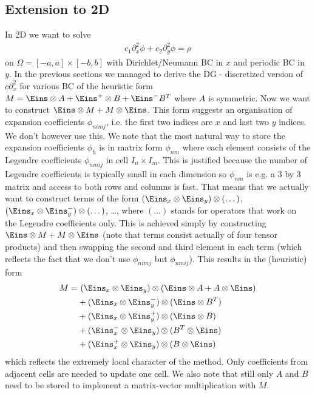 \documentclass[a4paper,12pt]{scrartcl}
\begin{document}
\subsection{Extension to 2D}
In 2D we want to solve
\begin{align}
    c_1\partial_x^2 \phi + c_2 \partial_y^2 \phi = \rho
    \label{}
\end{align}
on $\Omega = [-a,a]\times[-b,b]$ with Dirichlet/Neumann BC in $x$ and periodic BC
in $y$. 
In the previous sections we managed to derive the DG - discretized version of
$c\partial_x^2$ for various BC of the heuristic form
$M = \Eins\otimes A + \Eins^+ \otimes B + \Eins^- B^T$ where $A$ is symmetric.
Now we want to construct $\Eins\otimes M  + M \otimes \Eins$. This form 
suggests an organisation of expansion coefficients $\phi_{nimj}$, i.e. the 
first two indices are $x$ and last two $y$ indices. 
We don't however
use this. 
We note that
the most natural way to store the expansion coefficients $\phi_h$ is in matrix
form $\phi_{nm}$ where each element consists of the Legendre coefficients $\phi_{nmij}$
in cell $I_n\times I_m$. This is justified because the number of Legendre 
coefficients is typically small in each dimension so $\phi_{nm}$ is e.g. a 
$3$ by $3$ matrix and access to both rows and columns is fast.
That means that we actually want to construct terms of the form
    $(\Eins_x\otimes \Eins_y) \otimes( \dots)$, 
    $(\Eins_x\otimes \Eins^-_y) \otimes( \dots)$, \dots, 
where $(\dots)$ stands for operators that work on the Legendre coefficients only.
This is achieved simply by constructing $\Eins\otimes M  + M \otimes \Eins$ 
(note that terms consist actually of four tensor products) and then swapping the 
second and third element in each term (which reflects the fact that we don't use
$\phi_{nimj}$ but $\phi_{nmij}$). This results in the (heuristic) form
\begin{align}
    M =&\ (\Eins_x\otimes\Eins_y) \otimes (\Eins\otimes A + A\otimes \Eins) \nonumber\\
     &+ (\Eins_x\otimes\Eins_y^-) \otimes( \Eins\otimes B^T) \nonumber \\
     &+ (\Eins_x\otimes\Eins_y^+) \otimes( \Eins\otimes B) \nonumber \\
     &+ (\Eins_x^-\otimes\Eins_y) \otimes( B^T \otimes \Eins) \nonumber \\
     &+ (\Eins_x^+\otimes\Eins_y) \otimes( B\otimes \Eins) 
    \label{}
\end{align}
which reflects the extremely local character of the method. Only coefficients from 
adjacent cells are needed to update one cell. We also note that still only $A$ and 
$B$ need to be stored to implement a matrix-vector multiplication with $M$.
\end{document}
